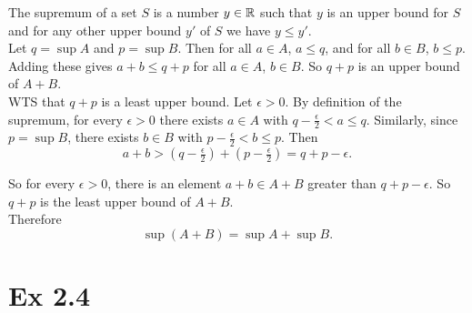 \documentclass{report}
\begin{document}
\begin{proofWithHibiscus}
  The supremum of a set $S$ is a number $y \in \mathbb{R}$ such that $y$ is an upper bound for $S$ and for any other upper bound $y'$ of $S$ we have $y \leq y'$. \\

  Let $q = \sup A$ and $p = \sup B$. Then for all $a \in A$, $a \leq q$, and for all $b \in B$, $b \leq p$. Adding these gives $a+b \leq q+p$ for all $a \in A$, $b \in B$. So $q+p$ is an upper bound of $A+B$. \\

  WTS that $q + p$ is a least upper bound. Let $\epsilon > 0$.  
  By definition of the supremum, for every $\epsilon > 0$ there exists $a \in A$ with $q - \tfrac{\epsilon}{2} < a \leq q$.  
  Similarly, since $p = \sup B$, there exists $b \in B$ with $p - \tfrac{\epsilon}{2} < b \leq p$.  
  Then
  \[
    a+b > (q-\tfrac{\epsilon}{2}) + (p-\tfrac{\epsilon}{2}) = q+p - \epsilon.
  \]
  
  So for every $\epsilon > 0$, there is an element $a+b \in A+B$ greater than $q+p - \epsilon$. So $q+p$ is the least upper bound of $A+B$. \\

  Therefore
  \[
    \sup(A+B) = \sup A + \sup B.
  \]
\end{proofWithHibiscus}




\section*{Ex 2.4}

\end{document}
